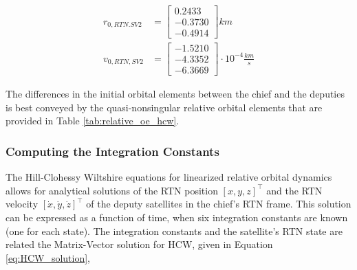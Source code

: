 \begin{align} \label{eq:SV3_HCW_RTN_init}
    r_{0, RTN. SV2} &= \begin{bmatrix}
        0.2433 \\
        -0.3730 \\
        -0.4914
    \end{bmatrix} km \\
    v_{0, RTN, SV2} &= \begin{bmatrix}
        -1.5210 \\
        -4.3352 \\
        -6.3669
    \end{bmatrix}\cdot 10^{-4} \frac{km}{s}
\end{align}

The differences in the initial orbital elements between the chief and the deputies is best conveyed by the quasi-nonsingular relative orbital elements that are provided in Table \ref{tab:relative_oe_hcw}.

\subsubsection{Computing the Integration Constants}

The Hill-Clohessy Wiltshire equations for linearized relative orbital dynamics allows for analytical solutions of the RTN position $[x, y, z]^\top$ and the RTN velocity $[\dot{x}, \dot{y}, \dot{z}]^\top$ of the deputy satellites in the chief's RTN frame. This solution can be expressed as a function of time, when six integration constants are known (one for each state). The integration constants and the satellite's RTN state are related the Matrix-Vector solution for HCW, given in Equation \ref{eq:HCW_solution}, 


